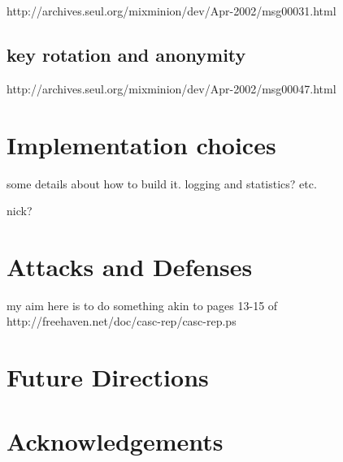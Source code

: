\documentclass{llncs}
\begin{document}
http://archives.seul.org/mixminion/dev/Apr-2002/msg00031.html

\subsection{key rotation and anonymity}

http://archives.seul.org/mixminion/dev/Apr-2002/msg00047.html


\section{Implementation choices}

some details about how to build it. logging and statistics? etc.

nick?


\section{Attacks and Defenses}

my aim here is to do something akin to pages 13-15 of
http://freehaven.net/doc/casc-rep/casc-rep.ps


\section{Future Directions}


\section*{Acknowledgements}


 
\end{document}
